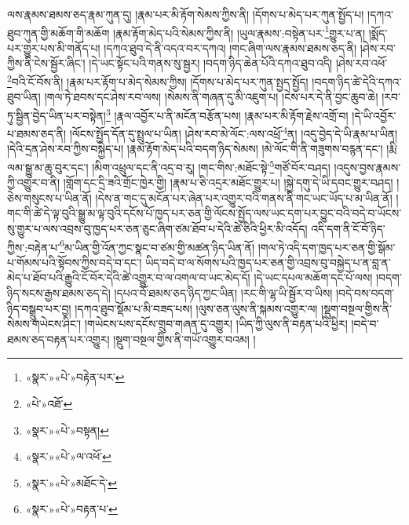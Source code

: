 ལས་རྣམས་ཐམས་ཅད་རྣམ་ཀུན་དུ། །རྣམ་པར་མི་རྟོག་སེམས་ཀྱིས་ནི། །དོགས་པ་མེད་པར་ཀུན་སྤྱོད་པ། །དཀའ་ཐུབ་ཀུན་གྱི་མཆོག་གི་མཆོག །རྣམ་རྟོག་མེད་པའི་སེམས་ཀྱིས་ནི། །ཡུལ་རྣམས་:བསྟེན་པར་\footnote{«སྣར་»«པེ་»བརྟེན་པར་}གྱུར་པ་ན། །སྨོད་པར་གྱུར་པས་མི་གནོད་པ། །དཀའ་ཐུབ་དེ་ནི་འདའ་བར་དཀའ། །གང་ཞིག་ལས་རྣམས་ཐམས་ཅད་ནི། །ཤེས་རབ་ཀྱིས་ནི་ངེས་སྦྱོར་ཞིང་། །དེ་ཡང་སྟོང་པའི་གནས་སུ་སྦྱར། །བདག་ཉིད་ཆེན་པོའི་དཀའ་ཐུབ་འདི། །ཤེས་རབ་འཕོ་\footnote{«པེ་»འཐོ་}བའི་ངོ་བོས་ནི། །རྣམ་པར་རྟོག་པ་མེད་སེམས་ཀྱིས། །དོགས་པ་མེད་པར་ཀུན་སྤྱད་སྤྱོད། །བདག་ཉིད་ཚེ་དེའི་དཀའ་ཐུབ་ཡིན། །གལ་ཏེ་ཐབས་དང་ཤེས་རབ་ལས། །སེམས་ནི་གཞན་དུ་མི་འཇུག་པ། །ངེས་པར་དེ་ནི་བྱང་ཆུབ་ཆེ། །རབ་ཏུ་སྦྱིན་བྱེད་ཡིན་པར་བསྟེན།\footnote{«སྣར་»«པེ་»བསྟན།} །རྣལ་འབྱོར་པ་ནི་མངོན་བརྩོན་པས། །རྣམ་པར་མི་རྟོག་རྗེས་འགྲོ་བ། །དེ་ཡི་འབྱོར་པ་ཐམས་ཅད་ནི། །ལོངས་སྤྱོད་དོན་དུ་སྤྲུལ་པ་ཡིན། །ཤེས་རབ་མེ་ལོང་:ལས་འཕྲོ་\footnote{«སྣར་»«པེ་»ལ་འཕོ་}ན། །འདུ་བྱེད་དེ་ཡི་རྣམ་པ་ཡིན། །དེའི་དྲན་ཤེས་རབ་ཀྱིས་བསྐྱེད་པ། །རྣམ་རྟོག་མེད་པའི་བདག་ཉིད་སེམས། །མེ་ལོང་གི་ནི་གཟུགས་བརྙན་དང་། །རྨི་ལམ་སྒྱུ་མ་ཆུ་བུར་དང་། །མིག་འཕྲུལ་དང་ནི་འདྲ་བ་རུ། །གང་གིས་:མཐོང་སྟེ་\footnote{«སྣར་»«པེ་»མཐོང་དེ་}གཙོ་བོར་བཤད། །འདུས་བྱས་རྣམས་ཀྱི་འགྱུར་བ་ནི། །གློག་དང་དྲི་ཟའི་གྲོང་ཁྱེར་གྱི། །རྣམ་པ་ཅི་འདྲར་མཐོང་གྱུར་པ། །སྐྱེ་དགུ་དེ་ཡི་དབང་གྱུར་བཤད། །ཅེས་གསུངས་པ་ཡིན་ནོ། །དེས་ན་གང་དུ་མངོན་པར་ཞེན་པར་འགྱུར་བའི་གནས་ནི་གང་ཡང་ཡོད་པ་མ་ཡིན་ནོ། །གང་གི་ཚེ་དེ་ལྟ་བུའི་སྒྱུ་མ་ལྟ་བུའི་དངོས་པོ་ཁྱད་པར་ཅན་གྱི་ལོངས་སྤྱོད་ལས་ཡང་དག་པར་བྱུང་བའི་བདེ་བ་ཡོངས་སུ་གྱུར་པ་ལས་འབྲས་བུ་ཁྱད་པར་ཅན་ཅུང་ཞིག་ཙམ་ཐོབ་པ་དེའི་ཚེ་ཅིའི་ཕྱིར་མི་འདོད། འདི་དག་ནི་ངོ་བོ་ཉིད་ཀྱིས་:བརྟེན་པ་\footnote{«སྣར་»«པེ་»བརྟན་པ་}མ་ཡིན་གྱི་འོན་ཀྱང་སྣང་བ་ཙམ་གྱི་མཚན་ཉིད་ཡིན་ནོ། །གལ་ཏེ་འདི་དག་ཁྱད་པར་ཅན་གྱི་སྒོམ་པ་གོམས་པའི་སྟོབས་ཀྱིས་བདེ་བ་དང་། ཡིད་བདེ་བ་ལ་སོགས་པའི་ཁྱད་པར་ཅན་གྱི་འབྲས་བུ་བསྐྱེད་པ་ན་བླ་ན་མེད་པ་ཐོབ་པའི་རྒྱུའི་ངོ་བོར་དེའི་ཚེ་འགྱུར་བ་ལ་འགལ་བ་ཡང་མེད་དོ། །དེ་ཡང་དཔལ་མཆོག་དང་པོ་ལས། །བདག་ཉིད་སངས་རྒྱས་ཐམས་ཅད་དེ། །དཔའ་བོ་ཐམས་ཅད་ཉིད་ཀྱང་ཡིན། །རང་གི་ལྷ་ཡི་སྦྱོར་བ་ཡིས། །བདེ་བས་བདག་ཉིད་བསྒྲུབ་པར་བྱ། །དཀའ་ཐུབ་སྡོམ་པ་མི་བཟད་པས། །ལུས་ཅན་ལུས་ནི་སྐམས་འགྱུར་ལ། །སྡུག་བསྔལ་གྱིས་ནི་སེམས་གཡེངས་ཤིང་། །གཡེངས་པས་དངོས་གྲུབ་གཞན་དུ་འགྱུར། །ཡིད་ཀྱི་ལུས་ནི་བརྟན་པའི་ཕྱིར། །བདེ་བ་ཐམས་ཅད་བརྟན་པར་འགྱུར། །སྡུག་བསྔལ་གྱིས་ནི་གཡོ་འགྱུར་བའམ། །
